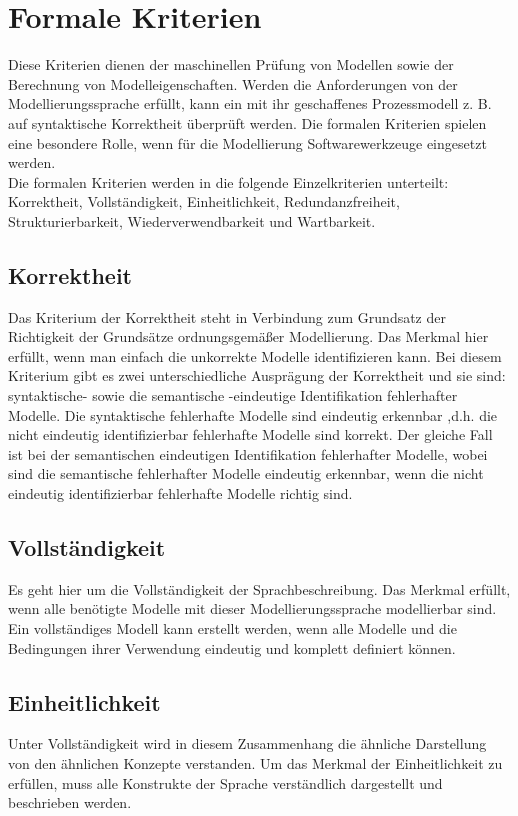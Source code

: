 \section{Formale Kriterien}  
\label{sc:FormaleKriterien}
Diese Kriterien dienen der maschinellen Prüfung von Modellen sowie der Berechnung von Modelleigenschaften. Werden die Anforderungen von der Modellierungssprache erfüllt, kann ein mit ihr geschaffenes Prozessmodell z. B. auf syntaktische Korrektheit überprüft werden. Die formalen Kriterien spielen eine besondere Rolle, wenn für die Modellierung Softwarewerkzeuge eingesetzt werden\cite{Lobe_2015}.\\
Die formalen Kriterien werden in die folgende Einzelkriterien unterteilt:  Korrektheit, Vollständigkeit, Einheitlichkeit, Redundanzfreiheit, Strukturierbarkeit, Wiederverwendbarkeit und Wartbarkeit.
\subsection{Korrektheit}
\label{ssc:Korrektheit}
Das Kriterium der Korrektheit steht in Verbindung zum Grundsatz der Richtigkeit der Grundsätze ordnungsgemäßer Modellierung.
Das Merkmal hier erfüllt, wenn man einfach die unkorrekte Modelle identifizieren kann.
Bei diesem Kriterium gibt es zwei unterschiedliche Ausprägung der Korrektheit und sie sind: syntaktische- sowie die semantische -eindeutige Identifikation fehlerhafter Modelle. 
Die syntaktische fehlerhafte Modelle sind eindeutig erkennbar ,d.h. die nicht eindeutig identifizierbar fehlerhafte Modelle sind korrekt. Der gleiche Fall ist bei der semantischen eindeutigen Identifikation fehlerhafter Modelle, wobei sind die semantische fehlerhafter Modelle eindeutig erkennbar, wenn die nicht eindeutig identifizierbar fehlerhafte Modelle richtig sind.
\subsection{Vollständigkeit}
\label{ssc:Vollständigkeit}
Es geht hier um die Vollständigkeit der Sprachbeschreibung. Das Merkmal erfüllt, wenn alle benötigte Modelle mit dieser Modellierungssprache modellierbar sind.
Ein vollständiges Modell kann erstellt werden, wenn alle Modelle und die Bedingungen ihrer Verwendung eindeutig und komplett definiert können.
\subsection{Einheitlichkeit}
\label{ssc:Einheitlichkeit}
Unter Vollständigkeit wird in diesem Zusammenhang die ähnliche Darstellung von den ähnlichen Konzepte verstanden.
Um das Merkmal der Einheitlichkeit zu erfüllen, muss alle Konstrukte der Sprache verständlich dargestellt und beschrieben werden.
